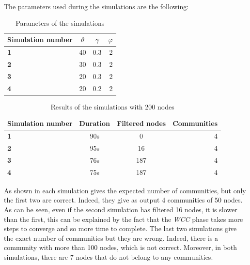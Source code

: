 \documentclass[12pt]{article}
\begin{document}
The parameters used during the simulations are the following:
\begin{table}[tbhp]
    \centering
    \begin{tabu}{|l|c|c|r|}
        \hline
        Simulation number & $\theta$ & $\gamma$  & $\varphi$  \\ \hline
        \textbf{1}    & 40  & 0.3  & 2   \\ \hline
        \textbf{2}    & 30  & 0.3  & 2   \\ \hline
        \textbf{3}    & 20  & 0.3  & 2   \\ \hline
        \textbf{4}    & 20  & 0.2  & 2   \\ \hline

  \end{tabu}                                                                                        \label{tab:parameters3}
    \caption[A Table]{Parameters of the simulations}
\end{table}
\newpage
\begin{table}[H]
    \centering
    \begin{tabu}{|l|c|c|r|}
        \hline
        Simulation number & Duration & Filtered nodes  & Communities  \\ \hline
        \textbf{1}    & 90s  & 0  & 4   \\ \hline
        \textbf{2}    & 95s  & 16  & 4   \\ \hline
        \textbf{3}    & 76s  & 187  & 4    \\ \hline
        \textbf{4}    & 75s  & 187  & 4  \\  \hline
    \end{tabu}

    \caption{Results of the simulations with 200 nodes}
    \label{tab:result3}
\end{table}

As shown in  each simulation gives the expected number of communities, but only the first two are correct. Indeed, they give as output 4 communities of 50 nodes.
As can be seen, even if the second simulation has filtered 16 nodes, it is slower than the first, this can be explained by the fact that the \emph{WCC} phase takes more steps to converge and so more time to complete. The last two simulations give the exact number of communities but they are wrong. Indeed, there is a community with more than 100 nodes, which is not correct. Moreover, in both simulations, there are 7 nodes that do not belong to any communities.
\end{document}
